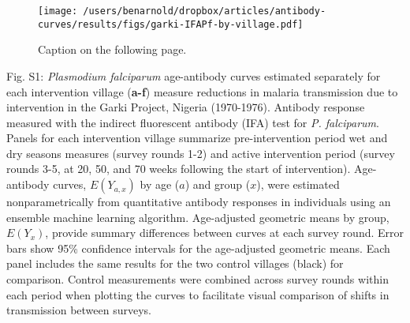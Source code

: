 \documentclass[11pt]{article}
\begin{document}
\renewcommand{\figurename}{Fig.}
\setcounter{figure}{0} 
\renewcommand{\thefigure}{S\arabic{figure}}



\clearpage
\begin{figure}[htbp]
\begin{center}
\texttt{[image: /users/benarnold/dropbox/articles/antibody-curves/results/figs/garki-IFAPf-by-village.pdf]}
\begin{minipage}{\textwidth}
\caption{Caption on the following page.}
\label{fig:garkiVillageEy}
\end{minipage}
\end{center}
\end{figure}
\clearpage
Fig. S1: \textit{Plasmodium falciparum} age-antibody curves estimated separately for each intervention village (\textbf{a-f}) measure reductions in malaria transmission due to intervention in the Garki Project, Nigeria (1970-1976).  Antibody response measured with the indirect fluorescent antibody (IFA) test for \textit{P. falciparum}. Panels for each intervention village summarize pre-intervention period wet and dry seasons measures (survey rounds 1-2) and active intervention period (survey rounds 3-5, at 20, 50, and 70 weeks following the start of intervention).  Age-antibody curves, $E(Y_{a,x})$ by age ($a$) and group ($x$), were estimated nonparametrically from quantitative antibody responses in individuals using an ensemble machine learning algorithm. Age-adjusted geometric means by group, $E(Y_x)$, provide summary differences between curves at each survey round. Error bars show 95\% confidence intervals for the age-adjusted geometric means. Each panel includes the same results for the two control villages (black) for comparison.  Control measurements were combined across survey rounds within each period when plotting the curves to facilitate visual comparison of shifts in transmission between surveys. 
\end{document}
